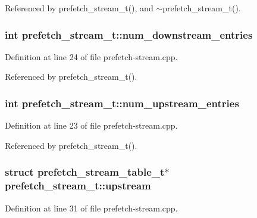 Referenced by prefetch\_\-stream\_\-t(), and $\sim$prefetch\_\-stream\_\-t().
\subsubsection[{num\_\-downstream\_\-entries}]{\setlength{\rightskip}{0pt plus 5cm}int {\bf prefetch\_\-stream\_\-t::num\_\-downstream\_\-entries}\hspace{0.3cm}{\tt  [protected]}}\label{classprefetch__stream__t_2acb112e8e4971df6834e5b044614465}




Definition at line 24 of file prefetch-stream.cpp.

Referenced by prefetch\_\-stream\_\-t().
\subsubsection[{num\_\-upstream\_\-entries}]{\setlength{\rightskip}{0pt plus 5cm}int {\bf prefetch\_\-stream\_\-t::num\_\-upstream\_\-entries}\hspace{0.3cm}{\tt  [protected]}}\label{classprefetch__stream__t_d3a7e7ed13004a44b8f38cae0251c914}




Definition at line 23 of file prefetch-stream.cpp.

Referenced by prefetch\_\-stream\_\-t().
\subsubsection[{upstream}]{\setlength{\rightskip}{0pt plus 5cm}struct {\bf prefetch\_\-stream\_\-table\_\-t}$\ast$ {\bf prefetch\_\-stream\_\-t::upstream}\hspace{0.3cm}{\tt  [read, protected]}}\label{classprefetch__stream__t_ecfcf8fa89bde687ce1c2aa0674edaeb}




Definition at line 31 of file prefetch-stream.cpp.

